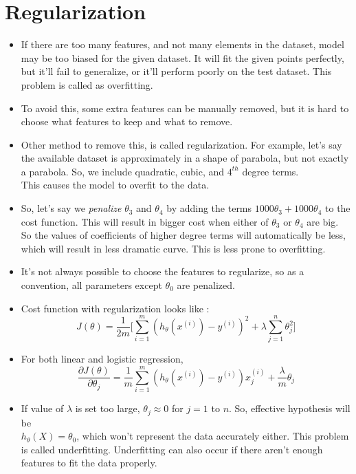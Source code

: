 \documentclass{article}
\begin{document}
\section*{Regularization}
\begin{itemize}
	\item If there are too many features, and not many elements in the dataset, model may be too biased for the given dataset. It will fit the given points perfectly, but it'll fail to generalize, or it'll perform poorly on the test dataset. This problem is called as overfitting.
	\item To avoid this, some extra features can be manually removed, but it is hard to choose what features to keep and what to remove.
	\item Other method to remove this, is called regularization. For example, let's say the available dataset is approximately in a shape of parabola, but not exactly a parabola. So, we include quadratic, cubic, and $4^{th}$ degree terms.\\ This causes the model to overfit to the data.
	\item So, let's say we \emph{penalize} $\theta_3$ and $\theta_4$ by adding the terms $1000\theta_3 + 1000\theta_4$ to the cost function. This will result in bigger cost when either of $\theta_3$ or $\theta_4$ are big. So the values of coefficients of higher degree terms will automatically be less, which will result in less dramatic curve. This is less prone to overfitting.
	\item It's not always possible to choose the features to regularize, so as a convention, all parameters except $\theta_0$ are penalized.
	\item Cost function with regularization looks like :
	$$J(\theta)= \frac{1}{2m} \Bigg[\sum_{i=1}^{m} (h_\theta(x^{(i)})-y^{(i)})^2 + \lambda \sum_{j=1}^n \theta_j^2 \Bigg]$$
	\item For both linear and logistic regression,
	$$\frac{\partial J(\theta)}{\partial \theta_j}=\frac{1}{m} \sum_{i=1}^{m} (h_\theta(x^{(i)})-y^{(i)})x_j^{(i)} + \frac{\lambda}{m} \theta_j$$
	\item If value of $\lambda$ is set too large, $\theta_j\approx 0$ for $j=1$ to $n$. So, effective hypothesis will be\\ $h_\theta(X)=\theta_0$, which won't represent the data accurately either. This problem is called underfitting. Underfitting can also occur if there aren't enough features to fit the data properly.
\end{itemize}
\end{document}
